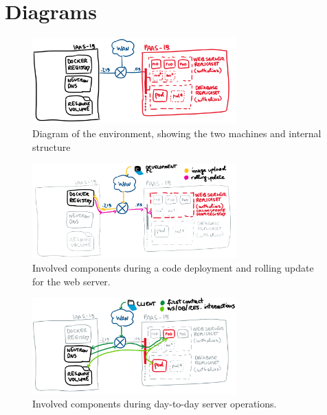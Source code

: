 
\onecolumn
\section{Diagrams}
\label{cha:diagrams}

    \begin{figure}[h]
        \centering
        \includegraphics[width=0.7\textwidth]{drawable/diagram-1.png}
        \caption{Diagram of the environment, showing the two machines and internal structure}
    \end{figure}
    
    \begin{figure}[h]
        \centering
        \includegraphics[width=0.7\textwidth]{drawable/diagram-2.png}
        \caption{Involved components during a code deployment and rolling update for the web server.}
    \end{figure}
    
    \begin{figure}[h]
        \centering
        \includegraphics[width=0.7\textwidth]{drawable/diagram-3.png}
        \caption{Involved components during day-to-day server operations.}
    \end{figure}